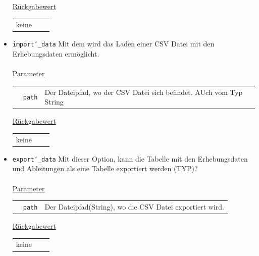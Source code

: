 \documentclass{article}
\begin{document}
\begin{itemize}
\underline{{Rückgabewert}}
\begin{tabular}{lll}
 keine \\
\end{tabular}

\item \texttt{import\char`_data} \newline Mit dem wird das Laden einer CSV Datei mit den Erhebungsdaten ermöglicht.
\\\\
\underline{{Parameter}}
\begin{tabular}{lll}
 & \texttt{path} & Der Dateipfad, wo der CSV Datei sich befindet. AUch vom Typ String \\
\end{tabular}

\underline{{Rückgabewert}}
\begin{tabular}{lll}
 keine \\
\end{tabular}

\item \texttt{export\char`_data} \newline Mit dieser Option, kann die Tabelle mit den Erhebungsdaten und Ableitungen als eine  Tabelle exportiert werden (TYP)?
\\\\
\underline{{Parameter}}
\begin{tabular}{lll}
 & \texttt{path} & Der Dateipfad(String), wo die CSV Datei exportiert wird. \\
\end{tabular}

\underline{{Rückgabewert}}
\begin{tabular}{lll}
 keine \\
\end{tabular}
\end{itemize}
\end{document}
